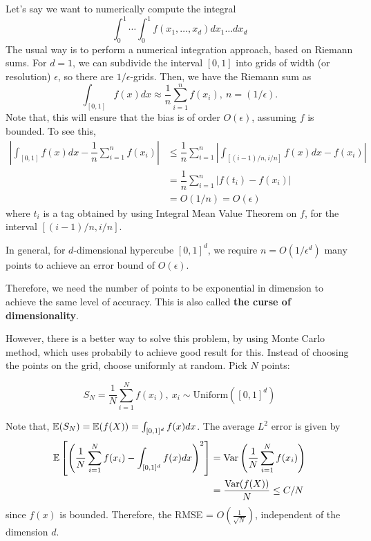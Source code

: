 \documentclass[12pt]{article}
\begin{document}
\begin{example}
	Let's say we want to numerically compute the integral
	\begin{equation*} 
		\int_0^1 \cdots \int_0^1 f(x_1, \ldots, x_d) dx_1 \ldots dx_d
	\end{equation*}
	The usual way is to perform a numerical integration approach, based on Riemann sums. For $d = 1$, we can subdivide the interval $[0, 1]$ into grids of width (or resolution) $\epsilon$, so there are $1/\epsilon$-grids. Then, we have the Riemann sum as 
	\begin{equation*}
		\int_{[0, 1]} f(x)dx \approx \dfrac{1}{n}\sum_{i=1}^n f(x_i), \ n = (1/\epsilon).
	\end{equation*}
	\noindent Note that, this will ensure that the bias is of order $O(\epsilon)$, assuming $f$ is bounded. To see this,
    \begin{align*}
        \left\vert \int_{[0, 1]} f(x)dx - \dfrac{1}{n}\sum_{i=1}^n f(x_i) \right\vert
        & \leq \dfrac{1}{n}\sum_{i=1}^{n} \left\vert \int_{[(i-1)/n, i/n]} f(x)dx - f(x_i) \right\vert\\
        & = \dfrac{1}{n}\sum_{i=1}^{n} \left\vert f(t_i) - f(x_i) \right\vert\\
        & = O(1/n) = O(\epsilon)
    \end{align*}
    \noindent where $t_i$ is a tag obtained by using Integral Mean Value Theorem on $f$, for the interval $[(i-1)/n, i/n]$. 

    In general, for $d$-dimensional hypercube $[0, 1]^d$, we require $n = O(1/\epsilon^d)$ many points to achieve an error bound of $O(\epsilon)$.
\end{example}

Therefore, we need the number of points to be exponential in dimension to achieve the same level of accuracy. This is also called \textbf{the curse of dimensionality}.

However, there is a better way to solve this problem, by using Monte Carlo method, which uses probabily to achieve good result for this. Instead of choosing the points on the grid, choose uniformly at random. Pick $N$ points:

\begin{equation*}
    S_N = \dfrac{1}{N}\sum_{i=1}^N f(x_i), \ x_i \sim \text{Uniform}([0, 1]^d)
\end{equation*} 

Note that, $\mathbb{E}(S_N) = \mathbb{E}(f(X)) = \int_{[0, 1]^d} f(x)dx$. The average $L^2$ error is given by
\begin{align*}
    \mathbb{E}\left[\left(\frac{1}{N} \sum_{i=1}^N f(x_i) - \int_{[0,1]^d} f(x) dx\right)^2 \right] 
    & = \mathrm{Var}\left( \frac{1}{N} \sum_{i=1}^N f(x_i) \right)\\
    & = \dfrac{\mathrm{Var}(f(X))}{N} \leq C/N
\end{align*}
\noindent since $f(x)$ is bounded. Therefore, the RMSE = $O(\frac{1}{\sqrt{N}})$, independent of the dimension $d$. 
\end{document}
